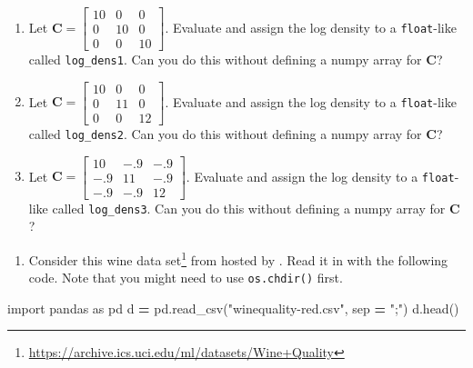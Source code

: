 \documentclass[12pt,krantz2]{krantz}
\makeatletter
\newenvironment{Shaded}{\begin{snugshade}}{\end{snugshade}}
\newcommand{\ImportTok}[1]{#1}
\newcommand{\NormalTok}[1]{#1}
\newcommand{\OperatorTok}[1]{\textcolor[rgb]{0.43,0.43,0.43}{\textbf{#1}}}
\newcommand{\StringTok}[1]{\textcolor[rgb]{0.5,0.5,0.5}{#1}}
\providecommand{\tightlist}{%
  \setlength{\itemsep}{0pt}\setlength{\parskip}{0pt}}
\renewcommand{\href}[2]{#2\footnote{\url{#1}}}
\newenvironment{kframe}{%
\medskip{}
\setlength{\fboxsep}{.8em}
 \def\at@end@of@kframe{}%
 \ifinner\ifhmode%
  \def\at@end@of@kframe{\end{minipage}}%
  \begin{minipage}{\columnwidth}%
 \fi\fi%
 \def\FrameCommand##1{\hskip\@totalleftmargin \hskip-\fboxsep
 \colorbox{shadecolor}{##1}\hskip-\fboxsep
     \hskip-\linewidth \hskip-\@totalleftmargin \hskip\columnwidth}%
 \MakeFramed {\advance\hsize-\width
   \@totalleftmargin\z@ \linewidth\hsize
   \@setminipage}}%
 {\par\unskip\endMakeFramed%
 \at@end@of@kframe}
\renewenvironment{Shaded}{\begin{kframe}}{\end{kframe}}
\makeatother
\begin{document}
\begin{enumerate}
\def\labelenumi{\alph{enumi}.}
\item
  Let \(\mathbf{C} = \begin{bmatrix} 10 & 0 & 0 \\ 0 & 10 & 0 \\ 0 & 0 & 10 \end{bmatrix}\). Evaluate and assign the log density to a \texttt{float}-like called \texttt{log\_dens1}. Can you do this without defining a numpy array for \(\mathbf{C}\)?
\item
  Let \(\mathbf{C} = \begin{bmatrix} 10 & 0 & 0 \\ 0 & 11 & 0 \\ 0 & 0 & 12 \end{bmatrix}\). Evaluate and assign the log density to a \texttt{float}-like called \texttt{log\_dens2}. Can you do this without defining a numpy array for \(\mathbf{C}\)?
\item
  Let \(\mathbf{C} = \begin{bmatrix} 10 & -.9 & -.9 \\ -.9 & 11 & -.9 \\ -.9 & -.9 & 12 \end{bmatrix}\). Evaluate and assign the log density to a \texttt{float}-like called \texttt{log\_dens3}. Can you do this without defining a numpy array for \(\mathbf{C}\)?
\end{enumerate}

\begin{enumerate}
\def\labelenumi{\arabic{enumi}.}
\setcounter{enumi}{1}
\tightlist
\item
  Consider this \href{https://archive.ics.uci.edu/ml/datasets/Wine+Quality}{wine data set} from \citep{wine_data} hosted by \citep{uci_data}. Read it in with the following code. Note that you might need to use \texttt{os.chdir()} first.
\end{enumerate}

\begin{Shaded}
\begin{Highlighting}[]
\ImportTok{import}\NormalTok{ pandas }\ImportTok{as}\NormalTok{ pd}
\NormalTok{d }\OperatorTok{=}\NormalTok{ pd.read_csv(}\StringTok{"winequality-red.csv"}\NormalTok{, sep }\OperatorTok{=} \StringTok{";"}\NormalTok{)}
\NormalTok{d.head()}
\end{Highlighting}
\end{Shaded}
\end{document}
